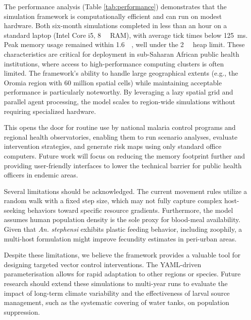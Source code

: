 \documentclass{article}
\begin{document}
\par 
The performance analysis (Table \ref{tab:performance}) demonstrates that the simulation framework is computationally efficient and can 
run on modest hardware. Both six-month simulations completed in less than an hour on a standard laptop (Intel Core i5, \SI{8}{\giga\byte} RAM), 
with average tick times below \SI{125}{\milli\second}. Peak memory usage remained within \SI{1.6}{\giga\byte}, well under the \SI{2}{\giga\byte} 
heap limit. These characteristics are critical for deployment in sub-Saharan African public health institutions, where access to high-performance 
computing clusters is often limited. The framework's ability to handle large geographical extents (e.g., the Oromia region with \num{60} 
million spatial cells) while maintaining acceptable performance is particularly noteworthy. By leveraging a lazy spatial grid and 
parallel agent processing, the model scales to region-wide simulations without requiring specialized hardware. 
\par
This opens the door for routine use by national malaria control programs and regional health observatories, enabling them to run scenario 
analyses, evaluate intervention strategies, and generate risk maps using only standard office computers. Future work will focus on reducing 
the memory footprint further and providing user-friendly interfaces to lower the technical barrier for public health officers in 
endemic areas.
\par
Several limitations should be acknowledged. The current movement rules utilize a random walk with a fixed step size, which may not fully capture 
complex host-seeking behaviors toward specific resource gradients. Furthermore, the model assumes human population density is the sole proxy 
for blood-meal availability. Given that \textit{An. stephensi} exhibits plastic feeding behavior, including zoophily, a multi-host formulation 
might improve fecundity estimates in peri-urban areas. 
\par
Despite these limitations, we believe the framework provides a valuable tool for designing targeted vector control interventions. The YAML-driven 
parameterisation allows for rapid adaptation to other regions or species. Future research should extend these simulations to multi-year runs 
to evaluate the impact of long-term climate variability and the effectiveness of larval source management, such as the systematic covering of 
water tanks, on population suppression.
\end{document}
